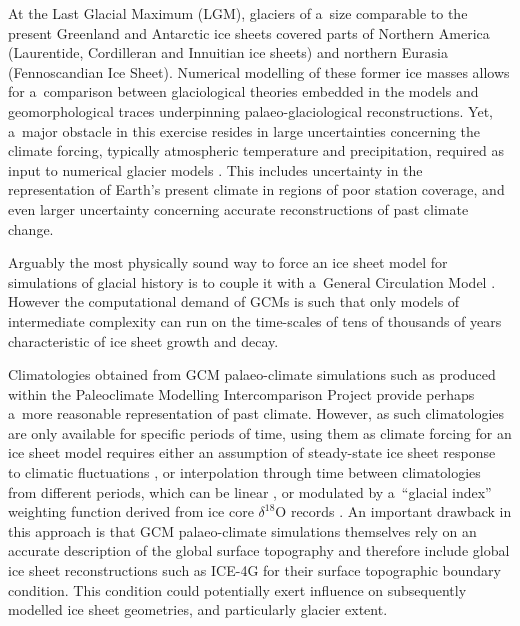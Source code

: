 \documentclass[tc, ms]{copernicus}
\begin{document}
\introduction
\label{sec:intro}

At the Last Glacial Maximum (LGM), glaciers of a~size comparable to the present Greenland and Antarctic ice sheets covered parts of Northern America (Laurentide, Cordilleran and Innuitian ice sheets) and northern Eurasia (Fennoscandian Ice Sheet). Numerical modelling of these former ice masses allows for a~comparison between glaciological theories embedded in the models and geomorphological traces underpinning palaeo-glaciological reconstructions. Yet, a~major obstacle in this exercise resides in large uncertainties concerning the climate forcing, typically atmospheric temperature and precipitation, required as input to numerical glacier models \citep{hebeler-etal-2008}. This includes uncertainty in the representation of Earth's present climate in regions of poor station coverage, and even larger uncertainty concerning accurate reconstructions of past climate change.

Arguably the most physically sound way to force an ice sheet model for simulations of glacial history is to couple it with a~General Circulation Model \citep[GCM;][]{yoshimori-etal-2001,calov-etal-2002,abeouchi-etal-2007,charbit-etal-2013}. However the computational demand of GCMs is such that only models of intermediate complexity can run on the time-scales of tens of thousands of years characteristic of ice sheet growth and decay.

Climatologies obtained from GCM palaeo-climate simulations such as produced within the Paleoclimate Modelling Intercomparison Project \citep[PMIP;][]{joussaume-taylor-1995} provide perhaps a~more reasonable representation of past climate. However, as such climatologies are only available for specific periods of time, using them as climate forcing for an ice sheet model requires either an assumption of steady-state ice sheet response to climatic fluctuations \citep{huybrechts-tsiobbel-1996}, or interpolation through time between climatologies from different periods, which can be linear \citep{charbit-etal-2002}, or modulated by a~``glacial index'' weighting function derived from ice core $\delta^{18}$O records \citep{marshall-clarke-1999,tarasov-peltier-2004,zweck-huybrechts-2005,gregoire-etal-2012}. An important drawback in this approach is that GCM palaeo-climate simulations themselves rely on an accurate description of the global surface topography and therefore include global ice sheet reconstructions such as ICE-4G \citep{peltier-1994} for their surface topographic boundary condition. This condition could potentially exert influence on subsequently modelled ice sheet geometries, and particularly glacier extent.
\end{document}
